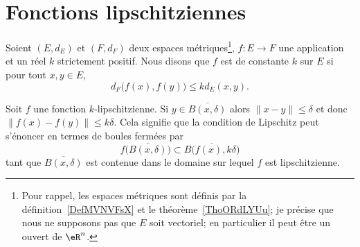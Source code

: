 
\section{Fonctions lipschitziennes}


\begin{definition}      \label{DEFooQHVEooDbYKmz}
	Soient \( (E,d_E)\) et \( (F,d_F)\) deux espaces métriques\footnote{Pour rappel, les espaces métriques sont définis par la définition~\ref{DefMVNVFsX} et le théorème~\ref{ThoORdLYUu}; je précise que nous ne supposons pas que \( E\) soit vectoriel; en particulier il peut être un ouvert de \( \eR^n\).}, \( f\colon E\to F\) une application et un réel \( k\) strictement positif. Nous disons que \( f\) est  de constante \( k\) sur \( E\) si pour tout \( x,y\in E\),
	\begin{equation}
		d_F\big( f(x),f(y) \big)\leq kd_E(x,y).
	\end{equation}
\end{definition}

Soit \( f\) une fonction \( k\)-lipschitzienne. Si \( y\in \overline{ B(x,\delta)}\) alors \( \| x-y \|\leq\delta\) et donc \( \big\| f(x)-f(y) \big\|\leq k\delta\). Cela signifie que la condition de Lipschitz peut s'énoncer en termes de boules fermées par
\begin{equation}    \label{EqDZvtUbn}
	f\big( \overline{ B(x,\delta) } \big)\subset \overline{  B\big( f(x),k\delta \big) }
\end{equation}
tant que \( \overline{ B(x,\delta) } \) est contenue dans le domaine sur lequel \( f\) est lipschitzienne.

